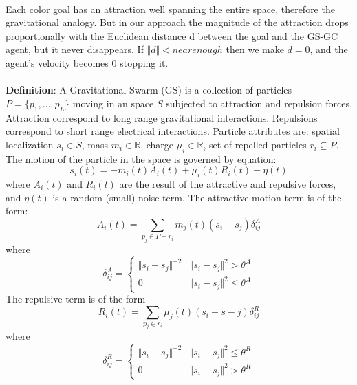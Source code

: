 \paragraph*{} Each color goal has an attraction well spanning the entire space, therefore the gravitational analogy. But in our approach the magnitude of the attraction drops proportionally with the Euclidean distance d between the goal and the GS-GC agent, but it never disappears. If $\Vert d \Vert < nearenough$ then we make $d = 0$, and the agent's velocity becomes 0 stopping it.
\paragraph*{} \textbf{Definition}: A Gravitational Swarm (GS) is a collection of particles $P = \lbrace p_1, \ldots , p_L \rbrace$ moving in an space $S$ subjected to attraction and repulsion forces. Attraction correspond to long range gravitational interactions. Repulsions correspond to short range electrical interactions. Particle attributes are: spatial localization $s_i \in S$, mass $m_i \in \mathbb{R}$, charge $\mu_i \in \mathbb{R}$, set of repelled particles $r_i \subseteq P$. The motion of the particle in the space is governed by equation:
\begin{equation}
s_i \left( t \right) = -m_i \left( t \right) A_i \left( t \right) + \mu_i \left( t \right) R_i \left( t \right) + \eta \left( t \right)
\end{equation}
where $A_i(t)$ and $R_i(t)$ are the result of the attractive and repulsive forces, and $\eta(t)$ is a random (small) noise term. The attractive motion term is of the form:
\begin{equation}
A_i(t) = \sum \limits_{p_j \in P - r_i} m_j(t)(s_i - s_j) \delta_{ij}^A
\end{equation}
where
\begin{equation}
\delta_{ij}^A = \begin{cases} 
\Vert s_i - s_j \Vert ^{-2} & \Vert s_i - s_j \Vert ^2 > \theta^A \\
0 & \Vert s_i - s_j \Vert ^2 \leq \theta^A 
\end{cases}
\end{equation}
The repulsive term is of the form
\begin{equation}
R_i(t) = \sum \limits_{p_j \in r_i} \mu_j(t)(s_i - s-j) \delta_{ij}^R
\end{equation}
where
\begin{equation}
\delta_{ij}^R = \begin{cases} 
\Vert s_i - s_j \Vert ^{-2} & \Vert s_i - s_j \Vert ^2 \leq \theta^R \\
0 & \Vert s_i - s_j \Vert ^2 > \theta^R 
\end{cases}
\end{equation}
